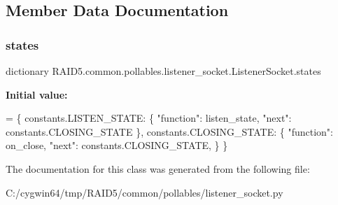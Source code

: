 \subsection{Member Data Documentation}
\mbox{\label{class_r_a_i_d5_1_1common_1_1pollables_1_1listener__socket_1_1_listener_socket_aef6af91bec6de61b5d52a30efdf9acb0}} 
\subsubsection{\texorpdfstring{states}{states}}
{\footnotesize\ttfamily dictionary R\+A\+I\+D5.\+common.\+pollables.\+listener\+\_\+socket.\+Listener\+Socket.\+states\hspace{0.3cm}{\ttfamily [static]}}

{\bfseries Initial value\+:}
\begin{DoxyCode}
=  \{
        constants.LISTEN\_STATE: \{
            \textcolor{stringliteral}{"function"}: listen\_state,
            \textcolor{stringliteral}{"next"}: constants.CLOSING\_STATE
        \},
        constants.CLOSING\_STATE: \{
            \textcolor{stringliteral}{"function"}: on\_close,
            \textcolor{stringliteral}{"next"}: constants.CLOSING\_STATE,
        \}
    \}
\end{DoxyCode}


The documentation for this class was generated from the following file\+:\begin{DoxyCompactItemize}
\item 
C\+:/cygwin64/tmp/\+R\+A\+I\+D5/common/pollables/listener\+\_\+socket.\+py\end{DoxyCompactItemize}
